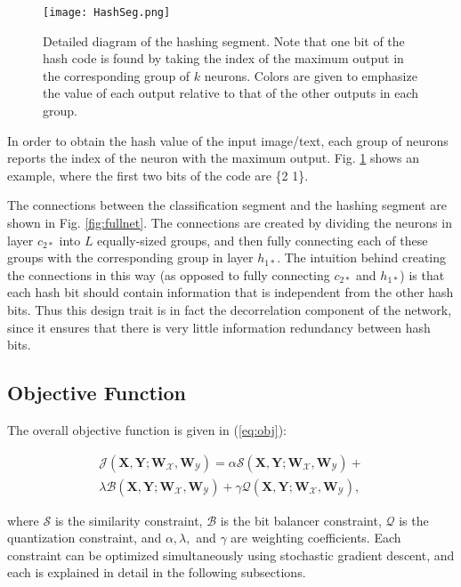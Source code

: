 \documentclass[letterpaper]{article}
\newcommand{\WX}{\mathbf{W}_\mathcal{X}}
\newcommand{\WY}{\mathbf{W}_\mathcal{Y}}
\newcommand{\X}{\mathbf{X}}
\newcommand{\Y}{\mathbf{Y}}
\begin{document}
\begin{figure}
	\centering
	\texttt{[image: HashSeg.png]}
	\caption{\label{fig:hashseg}Detailed diagram of the hashing segment. Note that one bit of the hash code is found by taking the index of the maximum output in the corresponding group of $ k $ neurons. Colors are given to emphasize the value of each output relative to that of the other outputs in each group.}
\end{figure}


In order to obtain the hash value of the input image/text, each group of neurons reports the index of the neuron with the maximum output. Fig. \ref{fig:hashseg} shows an example, where the first two bits of the code are \{2 1\}.

The connections between the classification segment and the hashing segment are shown in Fig. \ref{fig:fullnet}. The connections are created by dividing the neurons in layer $ c_{2*} $ into $ L $ equally-sized groups, and then fully connecting each of these groups with the corresponding group in layer $ h_{1*} $. The intuition behind creating the connections in this way (as opposed to fully connecting $ c_{2*} $ and $ h_{1*} $) is that each hash bit should contain information that is independent from the other hash bits. Thus this design trait is in fact the decorrelation component of the network, since it ensures that there is very little information redundancy between hash bits.

\subsection{Objective Function}

The overall objective function is given in (\ref{eq:obj}):

\begin{equation}
\label{eq:obj}
\begin{gathered}
\mathcal{J}(\X,\Y; \WX, \WY) = \alpha\mathcal{S}(\X,\Y; \WX, \WY) + \\
\lambda\mathcal{B}(\X,\Y; \WX, \WY) + 
\gamma\mathcal{Q}(\X,\Y; \WX, \WY),
\end{gathered}
\end{equation}

\noindent where $ \mathcal{S} $ is the similarity constraint, $ \mathcal{B} $ is the bit balancer constraint, $ \mathcal{Q} $ is the quantization constraint, and $ \alpha, \lambda, $ and $ \gamma $ are weighting coefficients. Each constraint can be optimized simultaneously using stochastic gradient descent, and each is explained in detail in the following subsections.
\end{document}
